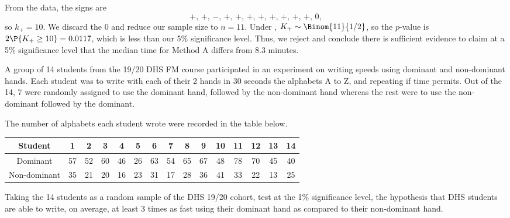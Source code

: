 \begin{solution}
\begin{ppart}
        From the data, the signs are \[+, \, +, \, -, \, +, \, +, \, +, \, +, \, +, \, +, \, +, \, +, \, 0,\] so $k_+ = 10$. We discard the 0 and reduce our sample size to $n = 11$. Under \nullhyp, $K_+ \sim \Binom{11}{1/2}$, so the $p$-value is $2\P{K_+ \geq 10} = 0.0117$, which is less than our 5\% significance level. Thus, we reject \nullhyp{} and conclude there is sufficient evidence to claim at a 5\% significance level that the median time for Method A differs from 8.3 minutes.
    \end{ppart}
\end{solution}

\begin{problem}
    A group of 14 students from the 19/20 DHS FM course participated in an experiment on writing speeds using dominant and non-dominant hands. Each student was to write with each of their 2 hands in 30 seconds the alphabets A to Z, and repeating if time permits. Out of the 14, 7 were randomly assigned to use the dominant hand, followed by the non-dominant hand whereas the rest were to use the non-dominant followed by the dominant.

    The number of alphabets each student wrote were recorded in the table below.

    \begin{table}[H]
        \centering
        \begin{tabular}{|c|c|c|c|c|c|c|c|c|c|c|c|c|c|c|}
            \hline
            Student & 1 & 2 & 3 & 4 & 5 & 6 & 7 & 8 & 9 & 10 & 11 & 12 & 13 & 14 \\ \hline
            Dominant & 57 & 52 & 60 & 46 & 26 & 63 & 54 & 65 & 67 & 48 & 78 & 70 & 45 & 40 \\ \hline
            Non-dominant & 35 & 21 & 20 & 16 & 23 & 31 & 17 & 28 & 36 & 41 & 33 & 22 & 13 & 25 \\ \hline
        \end{tabular}
    \end{table}

    Taking the 14 students as a random sample of the DHS 19/20 cohort, test at the 1\% significance level, the hypothesis that DHS students are able to write, on average, at least 3 times as fast using their dominant hand as compared to their non-dominant hand.
\end{problem}
